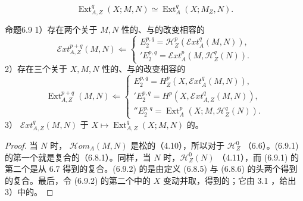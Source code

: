 \begin{equation}\operatorname{Ext}_{A,Z}^q(X;M,N)\simeq\operatorname{Ext}_A^q(X;M_Z,N).\tag{6.8.7}\end{equation}
\begin{SGAresult}{命题}{6.9}
1）存在两个关于 $M,N$ 性的、与的改变相容的
\begin{equation}\mathscr Ext_{A,Z}^{p+q}(M,N)\Longleftarrow
\begin{cases}E_2^{p,q}=\mathscr H_Z^p(\mathscr Ext_A^q(M,N)),\\
{}'E_2^{p,q}=\mathscr Ext_A^p(M,\mathscr H_Z^q(N)).\end{cases}\tag{6.9.1}\end{equation}
2）存在三个关于 $X,M,N$ 性的、与的改变相容的
\begin{equation}\operatorname{Ext}_{A,Z}^{p+q}(M,N)\Longleftarrow
\begin{cases}E_2^{p,q}=H_Z^p(X,\mathscr Ext_A^q(M,N)),\\
{}'E_2^{p,q}=H^p(X,\mathscr Ext_{A,Z}^q(M,N)),\\
{}''E_2^{p,q}=\operatorname{Ext}_A^p(X;M,\mathscr H_Z^q(N)).\end{cases}\tag{6.9.2}\end{equation}
3） $\mathscr Ext_{A,Z}^q(M,N)$ 于 $X\mapsto\operatorname{Ext}_{A,Z}^q(X;M,N)$ 的。
\end{SGAresult}
\begin{proof}
当 $N$ 时， $\mathscr Hom_A(M,N)$ 是松的（4.10），所以对于 $\mathscr H_Z^0$ （6.6）。(6.9.1) 的第一个就是复合的（6.8.1）。同样，当 $N$ 时，$\mathscr H_Z^0(N)$ （4.11），而 (6.9.1) 的第二个是从 6.7 得到的复合。(6.9.2) 的是由定义 (6.8.5) 与 (6.8.6) 的头两个得到的复合。最后，令 (6.9.2) 的第二个中的 $X$ 变动并取，得到的；它由 3.1 ，给出 3）中的。
\end{proof}
